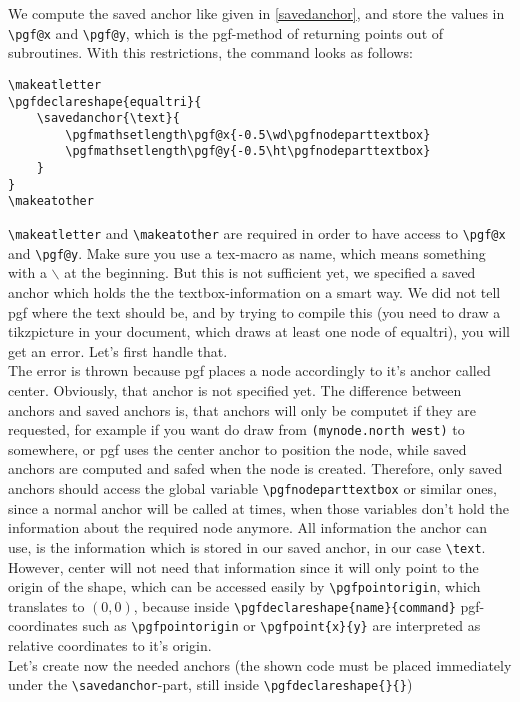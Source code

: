 \documentclass[12pt]{article}
\begin{document}
We compute the saved anchor like given in \autoref{savedanchor}, and store the values in \lstinline{\pgf@x} and \lstinline{\pgf@y}, which is the pgf-method of returning points out of subroutines. With this restrictions, the command looks as follows:
\begin{lstlisting}[caption={The creation of one saved anchor called $\backslash$top},label=savedanchor]
\makeatletter
\pgfdeclareshape{equaltri}{
	\savedanchor{\text}{
		\pgfmathsetlength\pgf@x{-0.5\wd\pgfnodeparttextbox}
		\pgfmathsetlength\pgf@y{-0.5\ht\pgfnodeparttextbox}
	}
}
\makeatother
\end{lstlisting}
\lstinline{\makeatletter} and \lstinline{\makeatother} are required in order to have access to \lstinline{\pgf@x} and \lstinline{\pgf@y}. Make sure you use a tex-macro as name, which means something with a $\backslash$ at the beginning. But this is not sufficient yet, we specified a saved anchor which holds the the textbox-information on a smart way. We did not tell pgf where the text should be, and by trying to compile this (you need to draw a tikzpicture in your document, which draws at least one node of equaltri), you will get an error. Let's first handle that.\\
The error is thrown because pgf places a node accordingly to it's anchor called center. Obviously, that anchor is not specified yet. The difference between anchors and saved anchors is, that anchors will only be computet if they are requested, for example if you want do draw from \lstinline{(mynode.north west)} to somewhere, or pgf uses the center anchor to position the node, while saved anchors are computed and safed when the node is created. Therefore, only saved anchors should access the global variable \lstinline!\pgfnodeparttextbox! or similar ones, since a normal anchor will be called at times, when those variables don't hold the information about the required node anymore. All information the anchor can use, is the information which is stored in our saved anchor, in our case \lstinline{\text}. However, center will not need that information since it will only point to the origin of the shape, which can be accessed easily by \lstinline{\pgfpointorigin}, which translates to $(0,0)$, because inside \lstinline!\pgfdeclareshape{name}{command}! pgf-coordinates such as \lstinline!\pgfpointorigin! or \lstinline!\pgfpoint{x}{y}! are interpreted as relative coordinates to it's origin.\\
Let's create now the needed anchors (the shown code must be placed immediately under the \lstinline|\savedanchor|-part, still inside \lstinline!\pgfdeclareshape{}{}!)
\end{document}
